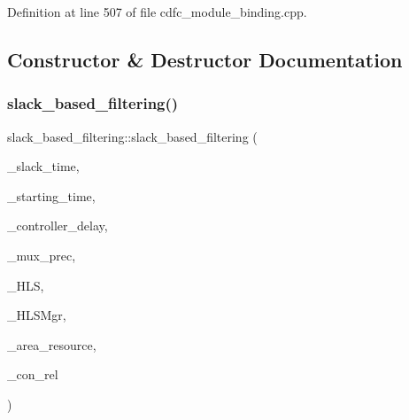 Definition at line 507 of file cdfc\+\_\+module\+\_\+binding.\+cpp.



\subsection{Constructor \& Destructor Documentation}
\mbox{\label{structslack__based__filtering_a88749de7f8fc5a3383f9b8e7347498e4}} 
\subsubsection{\texorpdfstring{slack\+\_\+based\+\_\+filtering()}{slack\_based\_filtering()}}
{\footnotesize\ttfamily slack\+\_\+based\+\_\+filtering\+::slack\+\_\+based\+\_\+filtering (\begin{DoxyParamCaption}\item[{const \hyperlink{custom__map_8hpp_ad1ed68f2ff093683ab1a33522b144adc}{Custom\+Unordered\+Map}$<$ \hyperlink{graph_8hpp_abefdcf0544e601805af44eca032cca14}{vertex}, double $>$ \&}]{\+\_\+slack\+\_\+time,  }\item[{const \hyperlink{custom__map_8hpp_ad1ed68f2ff093683ab1a33522b144adc}{Custom\+Unordered\+Map}$<$ \hyperlink{graph_8hpp_abefdcf0544e601805af44eca032cca14}{vertex}, double $>$ \&}]{\+\_\+starting\+\_\+time,  }\item[{double}]{\+\_\+controller\+\_\+delay,  }\item[{unsigned int}]{\+\_\+mux\+\_\+prec,  }\item[{const \hyperlink{hls_8hpp_a75d0c73923d0ddfa28c4843a802c73a7}{hls\+Ref}}]{\+\_\+\+H\+LS,  }\item[{const \hyperlink{hls__manager_8hpp_acd3842b8589fe52c08fc0b2fcc813bfe}{H\+L\+S\+\_\+manager\+Ref}}]{\+\_\+\+H\+L\+S\+Mgr,  }\item[{const double}]{\+\_\+area\+\_\+resource,  }\item[{const \hyperlink{cdfc__module__binding_8hpp_add937cbd74df34342adc0bb9231809a8}{connection\+\_\+relation} \&}]{\+\_\+con\+\_\+rel }\end{DoxyParamCaption})\hspace{0.3cm}{\ttfamily [inline]}}



